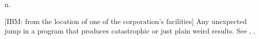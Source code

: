  n.

[IBM: from the location of one of the corporation's facilities] Any unexpected
jump in a program that produces catastrophic or just plain weird results. See
, .

